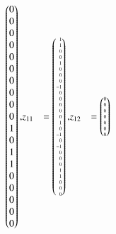 \begin{beispiel}
\begin{align*}
\begin{pmatrix*}[r]
 0\\
 0\\ %
 0\\ 
 0\\
 0\\
 0\\
 0\\ %
 0\\
 0\\
 0\\
 1\\
 0\\ %
 1\\
 1\\
 0\\
 0\\
 0\\ %
 0\\
 0
\end{pmatrix*},
&z_{11} %
&=
\tiny
\begin{pmatrix*}[r]
 1\\
 1\\
 0\\
 0\\
 1\\ %
 0\\
 0\\
 0\\
-1\\
 0\\ %
 0\\
 0\\
 0\\
 0\\
 1\\ %
 0\\
-1\\
 0\\
-1\\
 0\\ %
 0\\
 0\\
 1\\
 1\\
 0\\ %
 0\\
 0
\end{pmatrix*},
&z_{12} %
&=
\tiny
\begin{pmatrix*}[r]
 0\\
 0\\
 0\\
 0\\
 0\\
 0\\
 0\\

\end{pmatrix*}
\end{align*}
\end{beispiel}
